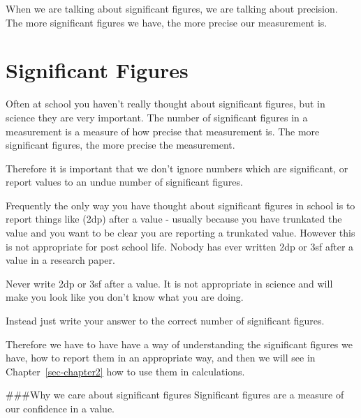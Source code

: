 \documentclass[
  letterpaper,
  DIV=11,
  numbers=noendperiod]{scrreprt}
\begin{document}
When we are talking about significant figures, we are talking about
precision. The more significant figures we have, the more precise our
measurement is.

\section{Significant Figures}\label{sec-significantfigures}

Often at school you haven't really thought about significant figures,
but in science they are very important. The number of significant
figures in a measurement is a measure of how precise that measurement
is. The more significant figures, the more precise the measurement.

Therefore it is important that we don't ignore numbers which are
significant, or report values to an undue number of significant figures.

Frequently the only way you have thought about significant figures in
school is to report things like (2dp) after a value - usually because
you have trunkated the value and you want to be clear you are reporting
a trunkated value. However this is not appropriate for post school life.
Nobody has ever written 2dp or 3sf after a value in a research paper.

\begin{tcolorbox}[enhanced jigsaw, arc=.35mm, bottomrule=.15mm, bottomtitle=1mm, breakable, colback=white, colbacktitle=quarto-callout-important-color!10!white, colframe=quarto-callout-important-color-frame, coltitle=black, left=2mm, leftrule=.75mm, opacityback=0, opacitybacktitle=0.6, rightrule=.15mm, title=\textcolor{quarto-callout-important-color}{\faExclamation}\hspace{0.5em}{Don't do this!}, titlerule=0mm, toprule=.15mm, toptitle=1mm]

Never write 2dp or 3sf after a value. It is not appropriate in science
and will make you look like you don't know what you are doing.

Instead just write your answer to the correct number of significant
figures.

\end{tcolorbox}

Therefore we have to have have a way of understanding the significant
figures we have, how to report them in an appropriate way, and then we
will see in Chapter~\ref{sec-chapter2} how to use them in calculations.

\#\#\#Why we care about significant figures Significant figures are a
measure of our confidence in a value.
\end{document}
